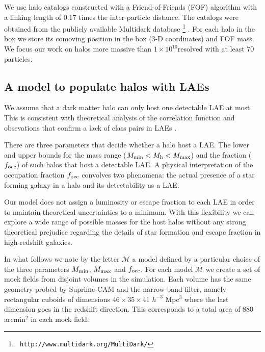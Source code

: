 \documentclass{emulateapj}
\newcommand{\ly}{{\ifmmode{{\rm Ly}\alpha}\else{Ly$\alpha$~}\fi}}
\newcommand{\hMsun}{{\ifmmode{h^{-1}{\rm
        {M_{\odot}}}}\else{$h^{-1}{\rm{M_{\odot}}}$}\fi}}
\begin{document}
We use halo catalogs constructed with a Friend-of-Friends (FOF)
algorithm with a linking length of 0.17 times the inter-particle
distance. The catalogs were obtained from the publicly available
Multidark database \footnote{{\tt
    http://www.multidark.org/MultiDark/}} \citep{MultiDark}. For each
halo in the box we store its comoving position in the box (3-D
coordinates) and FOF mass. We focus our work on halos more massive
than $1\times 10^{10}$\hMsun resolved with at least $70$ particles.

\subsection{A model to populate halos with LAEs}
\label{subsec:mocks}

We assume that a dark matter halo can only host one detectable LAE at
most.  This is consistent with theoretical analysis of the correlation
function \citep{Jose2013b} and obsevations that confirm a lack of
class pairs in LAEs \cite{Bond2009}. 

There are three parameters that decide whether a halo host a LAE. The
lower and upper bounds for the mass range ($M_{\rm min}< M_{\rm h} < M_{\rm max}$) 
and the fraction ($f_{\rm occ}$) of such halos that host a detectable
LAE. A physical interpretation of the occupation fraction $f_{\rm
  occ}$ convolves two phenomena: the actual presence of a star forming
galaxy in a halo and its detectability as a LAE.  


Our model does not assign a luminosity or escape fraction to each
LAE in order to maintain theoretical uncertainties to a minimum. With
this flexibility we can explore a wide range of possible masses for
the host halos without any strong theoretical prejudice regarding the
details of star formation and \ly escape fraction in high-redshift
galaxies.  

In what follows we note by the letter ${\mathcal M}$ a model
defined by a particular choice of the three parameters $M_{\rm
  min}$, $M_{\rm  max}$ and $f_{\rm occ}$. For each model ${\mathcal
  M}$ we create a set of mock fields from disjoint volumes in the
simulation. Each volume has the same geometry probed by Suprime-CAM
and the narrow band filter, namely rectangular cuboids of dimensions
$46\times 35\times 41$ $h^{-3}$ Mpc$^{3}$ where the last dimension goes
in the redshift direction. This corresponds to a total area of $880$
arcmin$^{2}$ in each mock field. 
\end{document}
